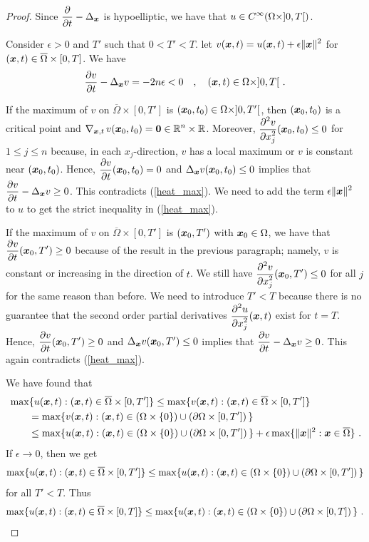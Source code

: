 \begin{proof}
Since $\displaystyle \frac{\partial{}}{\partial t}-\Delta_{{\bm{x}}}$ is hypoelliptic, we
have that $\displaystyle u \in C^\infty(\Omega\times ]0,T[)$.

Consider $\epsilon>0$ and $T'$ such that $0<T'<T$.  let
$\displaystyle v({\bm{x}},t) = u({\bm{x}},t) + \epsilon \|{\bm{x}}\|^2$
for $({\bm{x}},t) \in \overline{\Omega} \times [0,T]$.  We have
\begin{equation} \label{heat_max}
\frac{\partial{v}}{\partial t} - \Delta_{{\bm{x}}} v = -2n\epsilon < 0 \quad , \quad
({\bm{x}},t) \in \Omega \times ]0,T[ \  .
\end{equation}

If the maximum of $v$ on $\overline{\Omega}\times [0,T']$ is
$({\bm{x}}_0,t_0) \in \Omega\times ]0,T'[$, then $({\bm{x}}_0,t_0)$ is a
critical point and
$\displaystyle \operatorname{\nabla}_{{\bm{x}},t} v({\bm{x}}_0,t_0) = {\bm{0}} \in \mathbb{R}^n\times \mathbb{R}$.
Moreover, $\displaystyle \frac{\displaystyle \partial^{2}{v}} {\displaystyle \partial x_j^{2}}({\bm{x}}_0,t_0) \leq 0$ for
$1\leq j\leq n$ because, in each $x_j$-direction, $v$ has a local
maximum or $v$ is constant near $({\bm{x}}_0,t_0)$.
Hence, $\displaystyle \frac{\partial{v}}{\partial t}({\bm{x}}_0,t_0) =0$ and
$\Delta_{{\bm{x}}} v({\bm{x}}_0,t_0) \leq 0$ implies that
$\displaystyle \frac{\partial{v}}{\partial t} - \Delta_{{\bm{x}}} v \geq 0$.  This
contradicts (\ref{heat_max}).  We need to add the term
$\displaystyle \epsilon \|{\bm{x}}\|^2$ to $u$ to get the strict inequality in
(\ref{heat_max}).

If the maximum of $v$ on $\overline{\Omega}\times [0,T']$ is
$({\bm{x}}_0,T')$ with ${\bm{x}}_0 \in \Omega$, we have that
$\displaystyle \frac{\partial{v}}{\partial t}({\bm{x}}_0,T') \geq 0$ because of the
result in the previous paragraph; namely, $v$ is
constant or increasing in the direction of $t$.  We still have
$\displaystyle \frac{\displaystyle \partial^{2}{v}} {\displaystyle \partial x_j^{2}}({\bm{x}}_0,T') \leq 0$ for
all $j$ for the same reason than before.  We need to introduce $T'<T$
because there is no guarantee that the second order partial
derivatives $\displaystyle \frac{\displaystyle \partial^{2}{u}} {\displaystyle \partial x_j^{2}}({\bm{x}},t)$ exist for
$t=T$.  Hence, $\displaystyle \frac{\partial{v}}{\partial t}({\bm{x}}_0,T') \geq 0$ and
$\Delta_{{\bm{x}}} v({\bm{x}}_0,T') \leq 0$ implies that
$\displaystyle \frac{\partial{v}}{\partial t} - \Delta_{{\bm{x}}} v \geq 0$.  This again
contradicts (\ref{heat_max}).

We have found that
\begin{align*}
&\max \{ u({\bm{x}},t) : ({\bm{x}},t)\in \overline{\Omega}\times [0,T'] \}
\leq \max \{ v({\bm{x}},t) : ({\bm{x}},t)\in \overline{\Omega}\times
[0,T'] \} \\
&\qquad = \max \{ v({\bm{x}},t) : ({\bm{x}},t)\in (\Omega\times \{0\}) \cup
(\partial \Omega \times [0,T'])\,\} \\
&\qquad \leq \max \{ u({\bm{x}},t) : ({\bm{x}},t)\in (\Omega\times \{0\}) \cup
(\partial \Omega \times [0,T'])\,\} + \epsilon
\max \{ \|{\bm{x}}\|^2 : {\bm{x}}\in \overline{\Omega} \} \  .
\end{align*}
If $\epsilon \rightarrow 0$, then we get
\[
\max \{ u({\bm{x}},t) : ({\bm{x}},t)\in \overline{\Omega}\times [0,T'] \}
\leq \max \{ u({\bm{x}},t) : ({\bm{x}},t)\in (\Omega\times \{0\}) \cup
(\partial \Omega \times [0,T'])\,\}
\]
for all $T'<T$.  Thus
\[
\max \{ u({\bm{x}},t) : ({\bm{x}},t)\in \overline{\Omega}\times [0,T] \}
\leq \max \{ u({\bm{x}},t) : ({\bm{x}},t)\in (\Omega\times \{0\}) \cup
(\partial \Omega \times [0,T])\,\} \ . \qedhere
\]
\end{proof}

